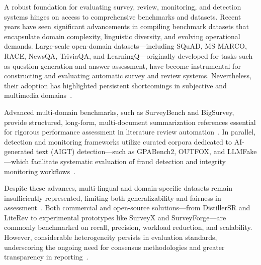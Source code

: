 \documentclass[sigconf]{acmart}
\begin{document}
A robust foundation for evaluating survey, review, monitoring, and detection systems hinges on access to comprehensive benchmarks and datasets. Recent years have seen significant advancements in compiling benchmark datasets that encapsulate domain complexity, linguistic diversity, and evolving operational demands. Large-scale open-domain datasets—including SQuAD, MS MARCO, RACE, NewsQA, TriviaQA, and LearningQ—originally developed for tasks such as question generation and answer assessment, have become instrumental for constructing and evaluating automatic survey and review systems. Nevertheless, their adoption has highlighted persistent shortcomings in subjective and multimedia domains~\cite{ref77,ref78,ref80}.

Advanced multi-domain benchmarks, such as SurveyBench and BigSurvey, provide structured, long-form, multi-document summarization references essential for rigorous performance assessment in literature review automation~\cite{ref102,ref104}. In parallel, detection and monitoring frameworks utilize curated corpora dedicated to AI-generated text (AIGT) detection—such as GPABench2, OUTFOX, and LLMFake—which facilitate systematic evaluation of fraud detection and integrity monitoring workflows~\cite{ref91,ref94,ref95}.

Despite these advances, multi-lingual and domain-specific datasets remain insufficiently represented, limiting both generalizability and fairness in assessment~\cite{ref92,ref113}. Both commercial and open-source solutions—from DistillerSR and LiteRev to experimental prototypes like SurveyX and SurveyForge—are commonly benchmarked on recall, precision, workload reduction, and scalability. However, considerable heterogeneity persists in evaluation standards, underscoring the ongoing need for consensus methodologies and greater transparency in reporting~\cite{ref88,ref90,ref91,ref92,ref111,ref112,ref113,ref114,ref115}.
\end{document}
